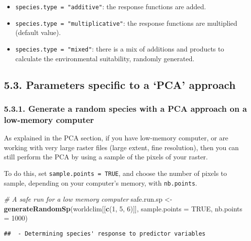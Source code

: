 \documentclass[]{article}
\newenvironment{Shaded}{\begin{snugshade}}{\end{snugshade}}
\newcommand{\KeywordTok}[1]{\textcolor[rgb]{0.13,0.29,0.53}{\textbf{#1}}}
\newcommand{\DataTypeTok}[1]{\textcolor[rgb]{0.13,0.29,0.53}{#1}}
\newcommand{\DecValTok}[1]{\textcolor[rgb]{0.00,0.00,0.81}{#1}}
\newcommand{\StringTok}[1]{\textcolor[rgb]{0.31,0.60,0.02}{#1}}
\newcommand{\CommentTok}[1]{\textcolor[rgb]{0.56,0.35,0.01}{\textit{#1}}}
\newcommand{\OtherTok}[1]{\textcolor[rgb]{0.56,0.35,0.01}{#1}}
\newcommand{\NormalTok}[1]{#1}
\providecommand{\tightlist}{%
  \setlength{\itemsep}{0pt}\setlength{\parskip}{0pt}}
\begin{document}
\begin{itemize}
\tightlist
\item
  \texttt{species.type\ =\ "additive"}: the response functions are
  added.
\item
  \texttt{species.type\ =\ "multiplicative"}: the response functions are
  multiplied (default value).
\item
  \texttt{species.type\ =\ "mixed"}: there is a mix of additions and
  products to calculate the environmental suitability, randomly
  generated.
\end{itemize}

\subsection{\texorpdfstring{5.3. Parameters specific to a `PCA'
approach}{5.3. Parameters specific to a PCA approach}}\label{parameters-specific-to-a-pca-approach}

\subsubsection{5.3.1. Generate a random species with a PCA approach on a
low-memory
computer}\label{generate-a-random-species-with-a-pca-approach-on-a-low-memory-computer}

As explained in the PCA section, if you have low-memory computer, or are
working with very large raster files (large extent, fine resolution),
then you can still perform the PCA by using a sample of the pixels of
your raster.

To do this, set \texttt{sample.points\ =\ TRUE}, and choose the number
of pixels to sample, depending on your computer's memory, with
\texttt{nb.points}.

\begin{Shaded}
\begin{Highlighting}[]
\CommentTok{# A safe run for a low memory computer}
\NormalTok{safe.run.sp <-}\StringTok{ }\KeywordTok{generateRandomSp}\NormalTok{(worldclim[[}\KeywordTok{c}\NormalTok{(}\DecValTok{1}\NormalTok{, }\DecValTok{5}\NormalTok{, }\DecValTok{6}\NormalTok{)]], }
                                \DataTypeTok{sample.points =} \OtherTok{TRUE}\NormalTok{,}
                                \DataTypeTok{nb.points =} \DecValTok{1000}\NormalTok{)}
\end{Highlighting}
\end{Shaded}

\begin{verbatim}
##  - Determining species' response to predictor variables
\end{verbatim}
\end{document}

